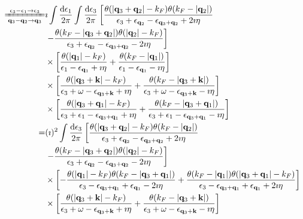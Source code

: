 \[ \begin{split} \xlongequal[\mathbf{q}_3-\mathbf{q}_2 \rightarrow \mathbf{q}_3]{\epsilon_3-\epsilon_1 \rightarrow \epsilon_3} &
\imath \int \frac{\mathrm{d}\epsilon_1}{2\pi} \int \frac{\mathrm{d}\epsilon_3}{2\pi}
\left[ \frac{\theta(|\mathbf{q}_3+\mathbf{q}_2|-k_F)\theta(k_F-|\mathbf{q}_2|)}{\epsilon_3+\epsilon_{\mathbf{q}_2}-\epsilon_{\mathbf{q}_3+\mathbf{q}_2}+2\imath \eta} \right. \\
& \left. - \frac{\theta(k_F-|\mathbf{q}_3+\mathbf{q}_2|)\theta(|\mathbf{q}_2|-k_F)}{\epsilon_3+\epsilon_{\mathbf{q}_2}-\epsilon_{\mathbf{q}_3+\mathbf{q}_2}-2\imath \eta} \right] \\
& \times \left[ \frac{\theta(|\mathbf{q}_1|-k_F)}{\epsilon_1-\epsilon_{\mathbf{q}_1}+\imath \eta} + \frac{\theta(k_F-|\mathbf{q}_1|)}{\epsilon_1-\epsilon_{\mathbf{q}_1}-\imath \eta} \right]\\
& \times \left[ \frac{\theta(|\mathbf{q}_3+\mathbf{k}|-k_F)}{\epsilon_3+\omega-\epsilon_{\mathbf{q}_3+\mathbf{k}}+\imath \eta} + \frac{\theta(k_F-|\mathbf{q}_3+\mathbf{k}|)}{\epsilon_3+\omega-\epsilon_{\mathbf{q}_3+\mathbf{k}}-\imath \eta} \right]\\
& \times \left[ \frac{\theta(|\mathbf{q}_3+\mathbf{q}_1|-k_F)}{\epsilon_3+\epsilon_1-\epsilon_{\mathbf{q}_3+\mathbf{q}_1}+\imath \eta} + \frac{\theta(k_F-|\mathbf{q}_3+\mathbf{q}_1|)}{\epsilon_3+\epsilon_1-\epsilon_{\mathbf{q}_3+\mathbf{q}_1}-\imath \eta} \right] \\
=& (\imath)^2 \int \frac{\mathrm{d}\epsilon_3}{2\pi}
\left[ \frac{\theta(|\mathbf{q}_3+\mathbf{q}_2|-k_F)\theta(k_F-|\mathbf{q}_2|)}{\epsilon_3+\epsilon_{\mathbf{q}_2}-\epsilon_{\mathbf{q}_3+\mathbf{q}_2}+2\imath \eta} \right. \\
& \left. - \frac{\theta(k_F-|\mathbf{q}_3+\mathbf{q}_2|)\theta(|\mathbf{q}_2|-k_F)}{\epsilon_3+\epsilon_{\mathbf{q}_2}-\epsilon_{\mathbf{q}_3+\mathbf{q}_2}-2\imath \eta} \right] \\
& \times \left[ -\frac{\theta(|\mathbf{q}_1|-k_F)\theta(k_F-|\mathbf{q}_3+\mathbf{q}_1|)}{\epsilon_3-\epsilon_{\mathbf{q}_3+\mathbf{q}_1}+\epsilon_{\mathbf{q}_1}-2\imath\eta} + \frac{\theta(k_F-|\mathbf{q}_1|)\theta(|\mathbf{q}_3+\mathbf{q}_1|-k_F)}{\epsilon_3-\epsilon_{\mathbf{q}_3+\mathbf{q}_1}+\epsilon_{\mathbf{q}_1}+2\imath\eta} \right] \\
& \times \left[ \frac{\theta(|\mathbf{q}_3+\mathbf{k}|-k_F)}{\epsilon_3+\omega-\epsilon_{\mathbf{q}_3+\mathbf{k}}+\imath \eta} + \frac{\theta(k_F-|\mathbf{q}_3+\mathbf{k}|)}{\epsilon_3+\omega-\epsilon_{\mathbf{q}_3+\mathbf{k}}-\imath \eta} \right]
\end{split} \]


